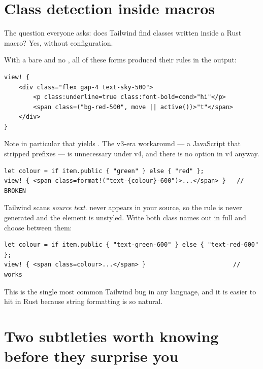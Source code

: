 \section{Class detection inside  macros}

The question everyone asks: does Tailwind find classes written inside a Rust macro? Yes, without
configuration.

\begin{verified}
With a bare  and no , all of these forms produced their
rules in the output:
\begin{lstlisting}[style=rs]
view! {
    <div class="flex gap-4 text-sky-500">
        <p class:underline=true class:font-bold=cond>"hi"</p>
        <span class=("bg-red-500", move || active())>"t"</span>
    </div>
}
\end{lstlisting}
Note in particular that  yields . The v3-era workaround
--- a JavaScript  that stripped  prefixes --- is unnecessary under v4,
and there is no  option in v4 anyway.
\end{verified}

\begin{antipattern}
\begin{lstlisting}[style=rs]
let colour = if item.public { "green" } else { "red" };
view! { <span class=format!("text-{colour}-600")>...</span> }   // BROKEN
\end{lstlisting}
Tailwind scans \emph{source text}.  never appears in your source, so the rule
is never generated and the element is unstyled. Write both class names out in full and choose
between them:
\begin{lstlisting}[style=rs]
let colour = if item.public { "text-green-600" } else { "text-red-600" };
view! { <span class=colour>...</span> }                        // works
\end{lstlisting}
This is the single most common Tailwind bug in any language, and it is easier to hit in Rust because
string formatting is so natural.
\end{antipattern}

\section{Two subtleties worth knowing before they surprise you}

